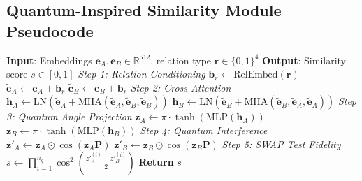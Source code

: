 \documentclass[journal,12pt]{IEEEtran}
\begin{document}
\subsection{Quantum-Inspired Similarity Module Pseudocode}
\begin{algorithm}[H]
    \caption{Quantum-Inspired Similarity Computation}
    \begin{algorithmic}[1]
        \STATE \textbf{Input}: Embeddings $\mathbf{e}_A, \mathbf{e}_B \in \mathbb{R}^{512}$,
                relation type $\mathbf{r} \in \{0,1\}^4$
        \STATE \textbf{Output}: Similarity score $s \in [0,1]$
        \STATE
        \STATE \textit{Step 1: Relation Conditioning}
        \STATE $\mathbf{b}_r \leftarrow \text{RelEmbed}(\mathbf{r})$ 
        \STATE $\tilde{\mathbf{e}}_A \leftarrow \mathbf{e}_A + \mathbf{b}_r$
        \STATE $\tilde{\mathbf{e}}_B \leftarrow \mathbf{e}_B + \mathbf{b}_r$
        \STATE
        \STATE \textit{Step 2: Cross-Attention}
        \STATE $\mathbf{h}_A \leftarrow \text{LN}(\tilde{\mathbf{e}}_A + \text{MHA}(\tilde{\mathbf{e}}_A, \tilde{\mathbf{e}}_B, \tilde{\mathbf{e}}_B))$
        \STATE $\mathbf{h}_B \leftarrow \text{LN}(\tilde{\mathbf{e}}_B + \text{MHA}(\tilde{\mathbf{e}}_B, \tilde{\mathbf{e}}_A, \tilde{\mathbf{e}}_A))$
        \STATE
        \STATE \textit{Step 3: Quantum Angle Projection}
        \STATE $\mathbf{z}_A \leftarrow \pi \cdot \tanh(\text{MLP}(\mathbf{h}_A))$
        \STATE $\mathbf{z}_B \leftarrow \pi \cdot \tanh(\text{MLP}(\mathbf{h}_B))$
        \STATE
        \STATE \textit{Step 4: Quantum Interference}
        \STATE $\mathbf{z}'_A \leftarrow \mathbf{z}_A \odot \cos(\mathbf{z}_A \mathbf{P})$
        \STATE $\mathbf{z}'_B \leftarrow \mathbf{z}_B \odot \cos(\mathbf{z}_B \mathbf{P})$
        \STATE
        \STATE \textit{Step 5: SWAP Test Fidelity}
        \STATE $s \leftarrow \prod_{i=1}^{n_q} \cos^2\!\left(\frac{z'^{(i)}_A - z'^{(i)}_B}{2}\right)$
        \STATE \textbf{Return} $s$
    \end{algorithmic}
\end{algorithm}
\end{document}
